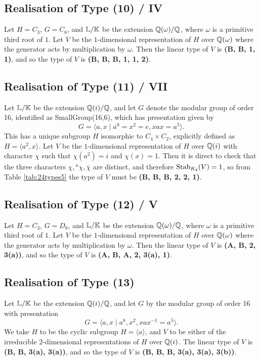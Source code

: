 \subsection{Realisation of Type (10) / IV}

Let $H = C_3$, $G = C_6$, and ${\mathbb L}/{\mathbb K}$ be the extension ${\mathbb Q}(\omega) / {\mathbb Q}$, where $\omega$ is a primitive third root of $1$. Let $V$ be the $1$-dimensional representation of $H$ over ${\mathbb Q}(\omega)$ where the generator acts by multiplication by $\omega$. Then the linear type of $V$ is \textbf{(B, B, 1, 1)}, and so the type of $V$ is \textbf{(B, B, B, 1, 1, 2)}.

\subsection{Realisation of Type (11) / VII}

Let ${\mathbb L} / {\mathbb K}$ be the extension ${\mathbb Q}(i) / {\mathbb Q}$, and let $G$ denote the modular group of order 16, identified as SmallGroup(16,6), which has presentation given by
\[
    G = \langle a, x \mid a^8 = x^2 = e, xax = a^5 \rangle.
\]  
This has a unique subgroup $H$ isomorphic to $C_4 \times C_2$, explicitly defined as $H = \langle a^2, x \rangle$. Let $V$ be the $1$-dimensional representation of $H$ over ${\mathbb Q}(i)$ with character $\chi$ such that $\chi(a^2) = i$ and $\chi(x) = 1$. Then it is direct to check that the three characters $\chi, {}^a \chi, \overline{\chi}$ are distinct, and therefore $\operatorname{Stab}_{K_4}(V) = 1$, so from Table \ref{tab:24types5} the type of $V$ must be \textbf{(B, B, B, 2, 2, 1)}.

\subsection{Realisation of Type (12) / V}

Let $H = C_3$, $G = D_6$, and ${\mathbb L}/{\mathbb K}$ be the extension ${\mathbb Q}(\omega) / {\mathbb Q}$, where $\omega$ is a primitive third root of $1$. Let $V$ be the $1$-dimensional representation of $H$ over ${\mathbb Q}(\omega)$ where the generator acts by multiplication by $\omega$. Then the linear type of $V$ is \textbf{(A, B, 2, 3(a))}, and so the type of $V$ is \textbf{(A, B, A, 2, 3(a), 1)}.

\subsection{Realisation of Type (13)}

Let ${\mathbb L} / {\mathbb K}$ be the extension ${\mathbb Q}(i) / {\mathbb Q}$, and let $G$ by the modular group of order 16 with presentation
\[
G = \langle a, x \mid a^8, x^2, xax^{-1} = a^5 \rangle.
\]
We take $H$ to be the cyclic subgroup $H = \langle a \rangle$, and $V$ to be either of the irreducible $2$-dimensional representations of $H$ over ${\mathbb Q}(i)$. The linear type of $V$ is \textbf{(B, B, 3(a), 3(a))}, and so the type of $V$ is \textbf{(B, B, B, 3(a), 3(a), 3(b))}.


